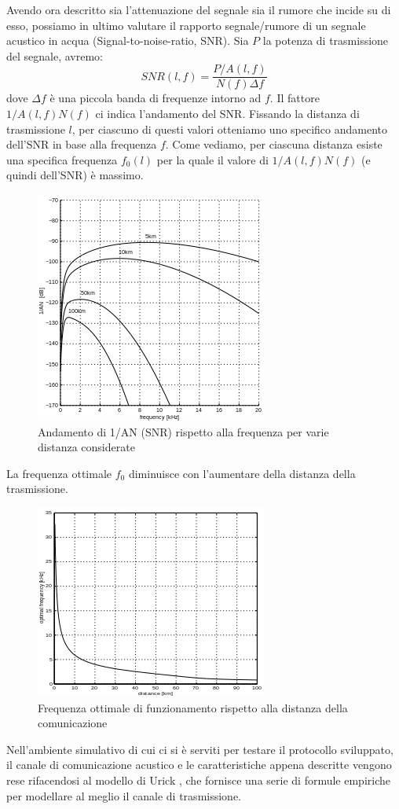 \documentclass[Lau,binding=0.6cm]{sapthesis}
\begin{document}
Avendo ora descritto sia l'attenuazione del segnale sia il rumore che incide su di esso, possiamo in ultimo valutare il rapporto segnale/rumore di un segnale acustico in acqua (Signal-to-noise-ratio, SNR).
Sia $P$ la potenza di trasmissione del segnale, avremo:
\[SNR(l, f) = \frac{P/A(l, f)}{N(f)\Delta f}\]
dove $\Delta f $ è una piccola banda di frequenze intorno ad $f$. Il fattore $1/A(l, f)N(f)$ ci indica l'andamento del SNR. Fissando la distanza di trasmissione $l$, per ciascuno di questi valori otteniamo uno specifico andamento dell'SNR in base alla frequenza $f$. Come vediamo, per ciascuna distanza esiste una specifica frequenza $f_0(l)$ per la quale il valore di $1/A(l, f)N(f)$ (e quindi dell'SNR) è massimo.
\begin{figure}[H]
\centering
    \includegraphics[]{snr.png}
    \caption{Andamento di 1/AN (SNR) rispetto alla frequenza per varie distanza considerate}
\end{figure}

La frequenza ottimale $f_0$ diminuisce con l'aumentare della distanza della trasmissione.
\begin{figure}[H]
    \centering
    \includegraphics[]{optimalfreq.png}
    \caption{Frequenza ottimale di funzionamento rispetto alla distanza della comunicazione}
\end{figure}
\par
Nell'ambiente simulativo di cui ci si è serviti per testare il protocollo sviluppato, il canale di comunicazione acustico e le caratteristiche appena descritte vengono rese rifacendosi al modello di Urick \cite{urick}, che fornisce una serie di formule empiriche per modellare al meglio il canale di trasmissione.
\end{document}
